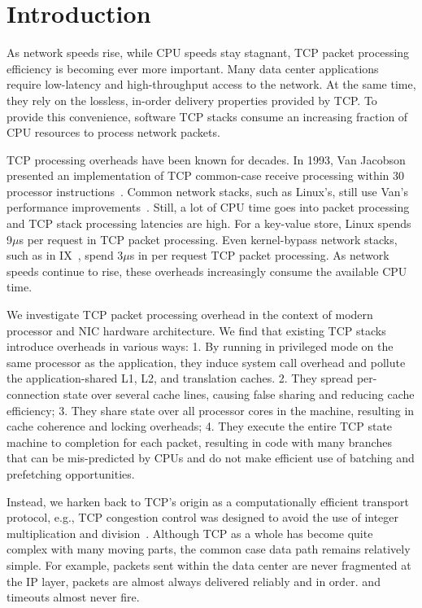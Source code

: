 \section{Introduction}

As network speeds rise, while CPU speeds stay stagnant, TCP packet
processing efficiency is becoming ever more important. Many data
center applications require low-latency and high-throughput access to
the network. At the same time, they rely on the lossless, in-order
delivery properties provided by TCP. To provide this convenience,
software TCP stacks consume an increasing fraction of CPU resources to
process network packets.

TCP processing overheads have been known for decades. In 1993, Van
Jacobson presented an implementation of TCP common-case receive
processing within 30 processor instructions~\cite{van_email}. Common
network stacks, such as Linux's, still use Van's performance
improvements~\cite{linux_van}. Still, a lot of CPU time goes into
packet processing and TCP stack processing latencies are high. For a
key-value store, Linux spends 9$\mu$s per request in TCP packet
processing. Even kernel-bypass network stacks, such as in
IX~\cite{belay:ix}, spend 3$\mu$s in per request TCP packet
processing. As network speeds continue to rise, these overheads
increasingly consume the available CPU time.

We investigate TCP packet processing overhead in the context of modern
processor and NIC hardware architecture. We find that existing TCP
stacks introduce overheads in various ways: 1. By running in
privileged mode on the same processor as the application, they induce
system call overhead and pollute the application-shared L1, L2, and
translation caches. 2. They spread per-connection state over several
cache lines, causing false sharing and reducing cache efficiency;
3. They share state over all processor cores in the machine, resulting
in cache coherence and locking overheads; 4. They execute the entire
TCP state machine to completion for each packet, resulting in code
with many branches that can be mis-predicted by CPUs and do not make
efficient use of batching and prefetching opportunities.

Instead, we harken back to TCP's origin as a computationally efficient
transport protocol, e.g., TCP congestion control was 
designed to avoid the use of integer multiplication and 
division~\cite{jacobsontcp}. 
Although TCP as a whole has become quite complex with many 
moving parts, the common case data path remains relatively simple. 
For example, packets sent within the data center are never fragmented 
at the IP layer, packets are almost always delivered reliably and in order.
and timeouts almost never fire.

